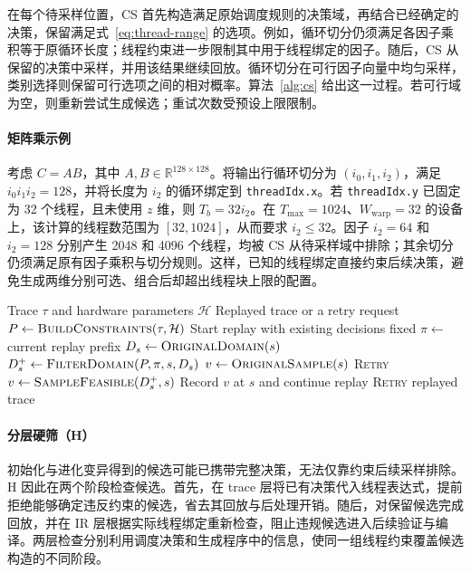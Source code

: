 \documentclass[11pt,twocolumn]{ctexart}
\begin{document}
在每个待采样位置，CS 首先构造满足原始调度规则的决策域，再结合已经确定的决策，保留满足式~\eqref{eq:thread-range} 的选项。例如，循环切分仍须满足各因子乘积等于原循环长度；线程约束进一步限制其中用于线程绑定的因子。随后，CS 从保留的决策中采样，并用该结果继续回放。循环切分在可行因子向量中均匀采样，类别选择则保留可行选项之间的相对概率。算法~\ref{alg:cs} 给出这一过程。若可行域为空，则重新尝试生成候选；重试次数受预设上限限制。

\paragraph{矩阵乘示例}
考虑 $C=AB$，其中 $A,B\in\mathbb{R}^{128\times128}$。将输出行循环切分为 $(i_0,i_1,i_2)$，满足 $i_0i_1i_2=128$，并将长度为 $i_2$ 的循环绑定到 \texttt{threadIdx.x}。若 \texttt{threadIdx.y} 已固定为 32 个线程，且未使用 $z$ 维，则 $T_b=32i_2$。在 $T_{\max}=1024$、$W_{\mathrm{warp}}=32$ 的设备上，该计算的线程数范围为 $[32,1024]$，从而要求 $i_2\le32$。因子 $i_2=64$ 和 $i_2=128$ 分别产生 2048 和 4096 个线程，均被 CS 从待采样域中排除；其余切分仍须满足原有因子乘积与切分规则。这样，已知的线程绑定直接约束后续决策，避免生成两维分别可选、组合后却超出线程块上限的配置。

\begin{algorithm}[!tb]
\caption{Constraint-guided sampling (CS)}
\label{alg:cs}
\small
\begin{algorithmic}[1]
\Require Trace $\tau$ and hardware parameters $\mathcal{H}$
\Ensure Replayed trace or a retry request
\State $P\gets\Call{BuildConstraints}{\tau,\mathcal{H}}$
\State Start replay with existing decisions fixed
    \State $\pi\gets$ current replay prefix
    \State $D_s\gets\Call{OriginalDomain}{s}$
    \State $D_s^{+}\gets\Call{FilterDomain}{P,\pi,s,D_s}$
        \State $v\gets\Call{OriginalSample}{s}$
        \State \Return \textsc{Retry}
    \Else
        \State $v\gets\Call{SampleFeasible}{D_s^{+},s}$
    \EndIf
    \State Record $v$ at $s$ and continue replay
\EndFor
{}
    \State \Return \textsc{Retry}
\EndIf
\State \Return replayed trace
\end{algorithmic}
\end{algorithm}

\paragraph{分层硬筛（H）}
初始化与进化变异得到的候选可能已携带完整决策，无法仅靠约束后续采样排除。H 因此在两个阶段检查候选。首先，在 trace 层将已有决策代入线程表达式，提前拒绝能够确定违反约束的候选，省去其回放与后处理开销。随后，对保留候选完成回放，并在 IR 层根据实际线程绑定重新检查，阻止违规候选进入后续验证与编译。两层检查分别利用调度决策和生成程序中的信息，使同一组线程约束覆盖候选构造的不同阶段。
\end{document}
